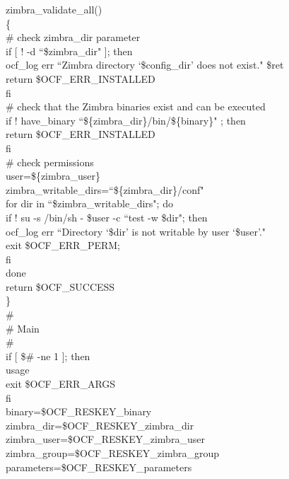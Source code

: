 \documentclass[a4paper, 12pt]{book}
\begin{document}
\noindent zimbra\_validate\_all()\\
\{\\
    \indent \# check zimbra\_dir parameter\\
    \indent if [ ! -d ``\$zimbra\_dir" ]; then\\
      \indent \indent ocf\_log err ``Zimbra directory `\$config\_dir' does not exist." \$ret\\
      \indent \indent return \$OCF\_ERR\_INSTALLED\\
    \indent fi\\
    \indent \# check that the Zimbra binaries exist and can be executed\\
    \indent if ! have\_binary ``\$\{zimbra\_dir\}/bin/\$\{binary\}" ; then\\
      \indent \indent return \$OCF\_ERR\_INSTALLED\\
    \indent fi\\

    \indent \# check permissions\\
    \indent user=\$\{zimbra\_user\}\\
    \indent zimbra\_writable\_dirs=``\$\{zimbra\_dir\}/conf"\\
    \indent for dir in ``\$zimbra\_writable\_dirs"; do\\
        \indent \indent if ! su -s /bin/sh - \$user -c ``test -w \$dir"; then\\
            \indent \indent \indent ocf\_log err ``Directory `\$dir' is not writable by user `\$user'."\\
            \indent \indent \indent exit \$OCF\_ERR\_PERM;\\
        \indent \indent fi\\
    \indent done\\

    \indent return \$OCF\_SUCCESS\\
\}\\

\noindent \#\\
\# Main\\
\#\\

\noindent if [ \$\# -ne 1 ]; then\\
    \indent usage\\
    \indent exit \$OCF\_ERR\_ARGS\\
fi\\

\noindent binary=\$OCF\_RESKEY\_binary\\
zimbra\_dir=\$OCF\_RESKEY\_zimbra\_dir\\
zimbra\_user=\$OCF\_RESKEY\_zimbra\_user\\
zimbra\_group=\$OCF\_RESKEY\_zimbra\_group\\
parameters=\$OCF\_RESKEY\_parameters\\
\end{document}
